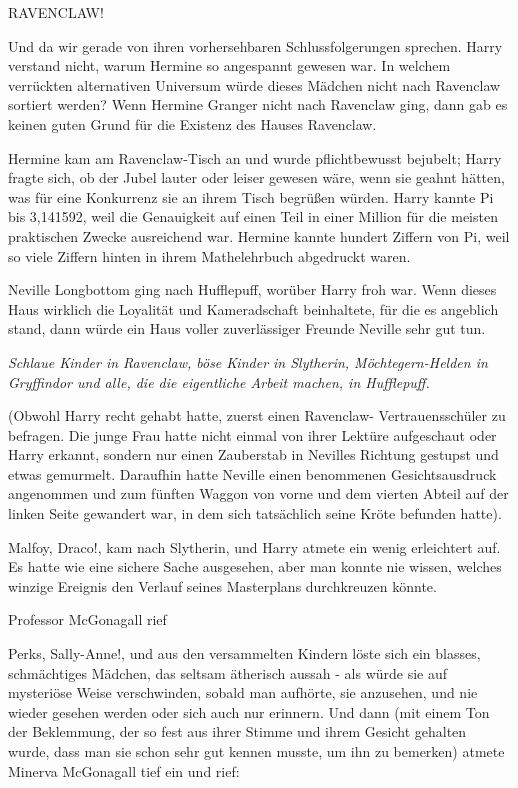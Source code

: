 \glqq RAVENCLAW!\grqq{}

Und da wir gerade von ihren vorhersehbaren Schlussfolgerungen sprechen. Harry
verstand nicht, warum Hermine so angespannt gewesen war. In welchem verrückten
alternativen Universum würde dieses Mädchen nicht nach Ravenclaw sortiert
werden? Wenn Hermine Granger nicht nach Ravenclaw ging, dann gab es keinen guten
Grund für die Existenz des Hauses Ravenclaw.

Hermine kam am Ravenclaw-Tisch an und wurde pflichtbewusst bejubelt; Harry
fragte sich, ob der Jubel lauter oder leiser gewesen wäre, wenn sie geahnt
hätten, was für eine Konkurrenz sie an ihrem Tisch begrüßen würden. Harry kannte
Pi bis 3,141592, weil die Genauigkeit auf einen Teil in einer Million für die
meisten praktischen Zwecke ausreichend war. Hermine kannte hundert Ziffern von
Pi, weil so viele Ziffern hinten in ihrem Mathelehrbuch abgedruckt waren.

Neville Longbottom ging nach Hufflepuff, worüber Harry froh war. Wenn dieses
Haus wirklich die Loyalität und Kameradschaft beinhaltete, für die es angeblich
stand, dann würde ein Haus voller zuverlässiger Freunde Neville sehr gut tun.

\emph{Schlaue Kinder in Ravenclaw, böse Kinder in Slytherin, Möchtegern-Helden
in Gryffindor und alle, die die eigentliche Arbeit machen, in Hufflepuff.}

(Obwohl Harry recht gehabt hatte, zuerst einen Ravenclaw- Vertrauensschüler zu
befragen. Die junge Frau hatte nicht einmal von ihrer Lektüre aufgeschaut oder
Harry erkannt, sondern nur einen Zauberstab in Nevilles Richtung gestupst und
etwas gemurmelt. Daraufhin hatte Neville einen benommenen Gesichtsausdruck
angenommen und zum fünften Waggon von vorne und dem vierten Abteil auf der
linken Seite gewandert war, in dem sich tatsächlich seine Kröte befunden hatte).

\glqq Malfoy, Draco!\grqq{}, kam nach Slytherin, und Harry atmete ein wenig
erleichtert auf. Es hatte wie eine sichere Sache ausgesehen, aber man konnte nie
wissen, welches winzige Ereignis den Verlauf seines Masterplans durchkreuzen
könnte.

Professor McGonagall rief

\glqq Perks, Sally-Anne!\grqq{}, und aus den versammelten Kindern löste sich
ein blasses, schmächtiges Mädchen, das seltsam ätherisch aussah - als würde sie
auf mysteriöse Weise verschwinden, sobald man aufhörte, sie anzusehen, und nie
wieder gesehen werden oder sich auch nur erinnern. Und dann (mit einem Ton der
Beklemmung, der so fest aus ihrer Stimme und ihrem Gesicht gehalten wurde, dass
man sie schon sehr gut kennen musste, um ihn zu bemerken) atmete Minerva
McGonagall tief ein und rief:

